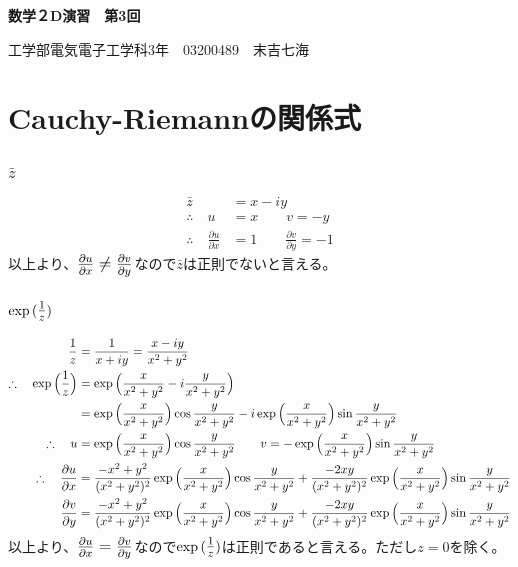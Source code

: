 \documentclass[dvipdfmx,a4paper]{jsarticle}
\begin{document}
\begin{center}
\textbf{\huge{数学２D演習　第3回}}
\end{center}

\begin{flushright}
工学部電気電子工学科3年　03200489　末吉七海\\
\end{flushright}

\section{Cauchy-Riemannの関係式}

\subsection{}

\subsubsection{$\bar{z}$}
\begin{align*}
\bar{z} &= x - iy\\
\therefore \quad u &= x \qquad v = -y\\
\therefore \quad \frac{\partial u}{\partial x} &= 1 \qquad \frac{\partial v}{\partial y} = -1
\end{align*}
以上より、$\mbox{\large $\frac{\partial u}{\partial x} \neq \frac{\partial v}{\partial y}$}$なので$\bar{z}$は正則でないと言える。

\subsubsection{$\exp{(\mbox{\large $\frac{1}{z}$})}$}
\begin{align*}
\frac{1}{z} &= \frac{1}{x + iy} = \frac{x-iy}{x^2 + y^2}\\
\therefore \quad \exp{\Bigl(\frac{1}{z}\Bigr)} &=  \exp{\Bigl(\frac{x}{x^2 + y^2} - i \frac{y}{x^2 + y^2}\Bigr)}\\
&= \exp{\Bigl(\frac{x}{x^2 + y^2}\Bigr)} \cos{\frac{y}{x^2 + y^2}} - i \exp{\Bigl(\frac{x}{x^2 + y^2}\Bigr)} \sin{\frac{y}{x^2 + y^2}}\\
\therefore \quad u &= \exp{\Bigl(\frac{x}{x^2 + y^2}\Bigr)} \cos{\frac{y}{x^2 + y^2}} \qquad v = -\exp{\Bigl(\frac{x}{x^2 + y^2}\Bigr)} \sin{\frac{y}{x^2 + y^2}}\\
\therefore \quad \frac{\partial u}{\partial x} &= \frac{-x^2+y^2}{(x^2+y^2)^2}\exp{\Bigl(\frac{x}{x^2 + y^2}\Bigr)} \cos{\frac{y}{x^2 + y^2}} + \frac{-2xy}{(x^2+y^2)^2}\exp{\Bigl(\frac{x}{x^2 + y^2}\Bigr)} \sin{\frac{y}{x^2 + y^2}}\\
\frac{\partial v}{\partial y} &= \frac{-x^2+y^2}{(x^2+y^2)^2}\exp{\Bigl(\frac{x}{x^2 + y^2}\Bigr)} \cos{\frac{y}{x^2 + y^2}} + \frac{-2xy}{(x^2+y^2)^2}\exp{\Bigl(\frac{x}{x^2 + y^2}\Bigr)} \sin{\frac{y}{x^2 + y^2}}
\end{align*}
以上より、$\mbox{\large $\frac{\partial u}{\partial x} = \frac{\partial v}{\partial y}$}$なので$\exp{(\mbox{\large $\frac{1}{z}$})}$は正則であると言える。ただし$z=0$を除く。
\end{document}
